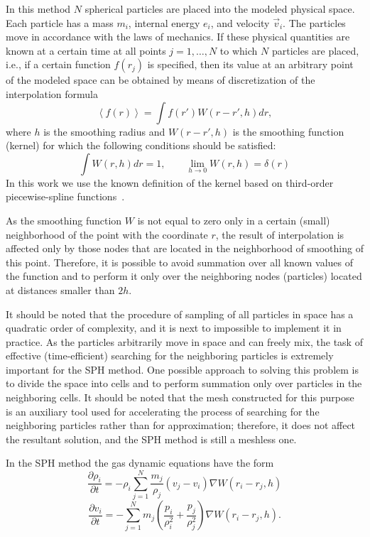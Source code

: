 \documentclass[a4paper]{jpconf}
\begin{document}
In this method $N$ spherical particles are placed into the modeled physical space. Each particle has a
mass $m_i$, internal energy $e_i$, and velocity $\vec{v}_i$. The particles move in accordance with the laws of mechanics. If these
physical quantities are known at a certain time at all points $j = 1,\ldots{},N$ to which $N$ particles are placed, i.e., if
a certain function $f(r_j)$ is specified, then its value at an arbitrary point of the modeled space can be obtained by
means of discretization of the interpolation formula
\[ \left\langle f(r) \right\rangle = \int f(r') W(r-r', h) dr,\]
where $h$ is the smoothing radius and $W(r-r', h)$ is the smoothing function (kernel) for which the following conditions
should be satisfied:
\[ \int W(r,h) dr = 1, \qquad   \lim_{h \to 0} W(r,h)=\delta(r)\]
In this work we use the known definition of the kernel based on third-order piecewise-spline functions~\cite{Monaghan1992}.	

As the smoothing function $W$ is not equal to zero only in a certain (small) neighborhood of the point with the
coordinate $r$, the result of interpolation is affected only by those nodes that are located in the neighborhood of
smoothing of this point. Therefore, it is possible to avoid summation over all known values of the function and to
perform it only over the neighboring nodes (particles) located at distances smaller than $2h$.

It should be noted that the procedure of sampling of all particles in space has a quadratic order of complexity,
and it is next to impossible to implement it in practice. As the particles arbitrarily move in space and can freely
mix, the task of effective (time-efficient) searching for the neighboring particles is extremely important for the
SPH method. One possible approach to solving this problem is to divide the space into cells and to perform
summation only over particles in the neighboring cells. It should be noted that the mesh constructed for this
purpose is an auxiliary tool used for accelerating the process of searching for the neighboring particles rather than
for approximation; therefore, it does not affect the resultant solution, and the SPH method is still a meshless one.
	
	In the SPH method the gas dynamic equations have the form
	\[  \frac{\partial \rho_i}{\partial t} = - \rho_i \sum\limits_{j=1}^{N} \frac{m_j}{\rho_j} (v_j -  v_i) \nabla W(r_i - r_j,h)
\]
\[\frac{\partial v_i}{\partial t} = - \sum\limits_{j=1}^{N} m_j \left ( \frac{p_i}{\rho_i^2} + \frac{p_j}{\rho_j^2} \right) \nabla W(r_i-r_j,h).\]
\end{document}

